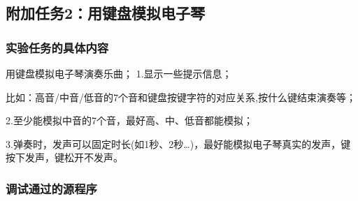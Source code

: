 \documentclass[12pt, a4paper, oneside]{ctexart}
\begin{document}
\subsection{附加任务2：用键盘模拟电子琴}
\subsubsection{实验任务的具体内容}
用键盘模拟电子琴演奏乐曲；
1.显示一些提示信息；

比如：高音/中音/低音的7个音和键盘按键字符的对应关系,按什么键结束演奏等；

2.至少能模拟中音的7个音，最好高、中、低音都能模拟；

3.弹奏时，发声可以固定时长(如1秒、2秒…)，最好能模拟电子琴真实的发声，键按下发声，键松开不发声。
\subsubsection{调试通过的源程序}
\end{document}
